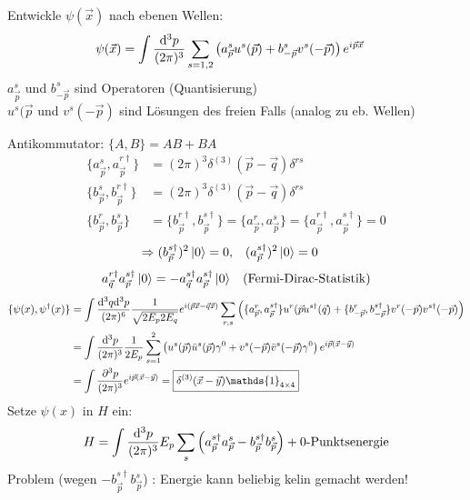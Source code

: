 Entwickle $\psi(\vec{x})$ nach ebenen Wellen:
	\begin{align*}
		\psi (\vec{x}) &= 
		\int \frac{\mathrm{d}^3 p}{(2 \pi)^3} \sum_{s=1,2} 
		\left(
			a_{\vec{p}}^s u^s(\vec{p}) + b_{-\vec{p}}^s v^s(-\vec{p})
		\right) e^{i\vec{p} \vec{x}}
	\end{align*}
$a_{\vec{p}}^s$ und $b_{-\vec{p}}^s$ sind Operatoren (Quantisierung) 
\\
$u^s(\vec{p}$ und $v^s(-\vec{p})$ sind Lösungen des freien Falls (analog zu eb. Wellen)

Antikommutator: $\{A, B\} = AB + BA$
	\begin{align*}
		\{a_{\vec{p}}^s, a_{\vec{p}}^{r \dagger} \} &= 
		(2 \pi)^3 \delta^{(3)} (\vec{p} - \vec{q}) \delta^{rs} \\
		\{b_{\vec{p}}^s, b_{\vec{p}}^{r \dagger} \} &= 
		(2 \pi)^3 \delta^{(3)} (\vec{p} - \vec{q}) \delta^{rs} \\
		\{b_{\vec{p}}^r, b_{\vec{p}}^{s} \} &= 
		\{b_{\vec{p}}^{r\dagger}, b_{\vec{p}}^{s\dagger} \} 
		= \{a_{\vec{p}}^r, a_{\vec{p}}^{s} \}
		= \{a_{\vec{p}}^{r\dagger}, a_{\vec{p}}^{s\dagger} \} = 0
	\end{align*}
	\begin{align*}
		\Rightarrow (b_{\vec{p}}^{s\dagger})^2 \ket{0} &= 0,&
		(a_{\vec{p}}^{s\dagger})^2 \ket{0} &= 0
	\end{align*}
	\begin{align*}
		a_{\vec{q}}^{r\dagger} a_{\vec{p}}^{s\dagger} \ket{0} &= 
		- a_{\vec{q}}^{s\dagger} a_{\vec{p}}^{s\dagger} \ket{0}
		&(\text{Fermi-Dirac-Statistik})
	\end{align*}
	\begin{align*}
		\{\psi(x), \psi^\dagger(x)\} &= 
		\int\frac{\diff^3 q \diff^3 p}{(2\pi)^6} 
		\frac{1}{\sqrt{2 E_p 2 E_q}} e^{i(\vec{p} \vec{x} - \vec{q} \vec{x})} 
		\sum_{r,s} 
		\left(
			\{a_{\vec{p}}^{r}, a_{\vec{p}}^{s\dagger}\} u^r(\vec{p} u^{s\dagger} (\vec{q}) 
			+ \{b_{-\vec{p}}^{r}, b_{-\vec{p}}^{s\dagger}\} v^r(-\vec{p}) v^{s\dagger} (-\vec{p})
		\right) \\
		&= \int \frac{\diff^3 p}{(2\pi)^3} \frac{1}{2 E_p} \sum_{s = 1}^{2} 
		\left(
			u^s(\vec{p}) \bar{u}^s(\vec{p}) \gamma^0 + v^s(-\vec{p}) \bar{v}^s (-\vec{p}) \gamma^0
		\right) e^{i \vec{p}(\vec{x}- \vec{y})} \\
		&= \int \frac{\partial^3 p}{(2\pi)^3} e^{i\vec{p}(\vec{x}- \vec{y})} = 
		\boxed{\delta^{(3)}(\vec{x} - \vec{y}) \mathds{1}_{4 \times 4}}
	\end{align*}
Setze $\psi(x)$ in $H$ ein:
	\begin{align*}
		H = \int \frac{\mathrm{d}^3 p}{(2\pi)^3} E_p \sum_s 
		\left(
			a_{\vec{p}}^{s\dagger} a_{\vec{p}}^{s} - b_{\vec{p}}^{s\dagger} b_{\vec{p}}^{s} 
		\right) + \text{0-Punktsenergie}
	\end{align*}
Problem (wegen $- b_{\vec{p}}^{s\dagger} b_{\vec{p}}^{s}$) : Energie kann beliebig kelin gemacht werden!

